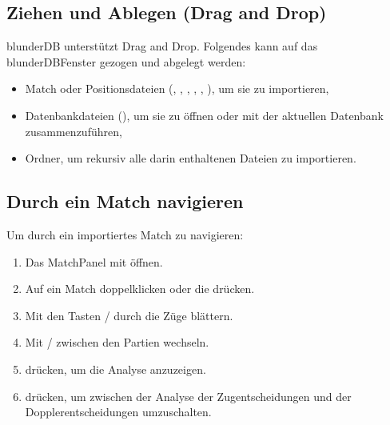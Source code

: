 \documentclass[letterpaper,10pt,german]{sphinxmanual}
\begin{document}
\subsection{Ziehen und Ablegen (Drag and Drop)}
\label{\detokenize{guide_utilisateur:glisser-deposer}}
\sphinxAtStartPar
blunderDB unterstützt Drag and Drop. Folgendes kann auf das blunderDB\sphinxhyphen{}Fenster gezogen und abgelegt werden:
\begin{itemize}
\item {} 
\sphinxAtStartPar
Match\sphinxhyphen{} oder Positionsdateien (, , , , , ), um sie zu importieren,

\item {} 
\sphinxAtStartPar
Datenbankdateien (), um sie zu öffnen oder mit der aktuellen Datenbank zusammenzuführen,

\item {} 
\sphinxAtStartPar
Ordner, um rekursiv alle darin enthaltenen Dateien zu importieren.

\end{itemize}


\subsection{Durch ein Match navigieren}
\label{\detokenize{guide_utilisateur:naviguer-dans-un-match}}
\sphinxAtStartPar
Um durch ein importiertes Match zu navigieren:
\begin{enumerate}
%
\item {} 
\sphinxAtStartPar
Das Match\sphinxhyphen{}Panel mit  öffnen.

\item {} 
\sphinxAtStartPar
Auf ein Match doppelklicken oder die  drücken.

\item {} 
\sphinxAtStartPar
Mit den Tasten  /  durch die Züge blättern.

\item {} 
\sphinxAtStartPar
Mit  /  zwischen den Partien wechseln.

\item {} 
\sphinxAtStartPar
{} drücken, um die Analyse anzuzeigen.

\item {} 
\sphinxAtStartPar
{} drücken, um zwischen der Analyse der Zugentscheidungen und der Dopplerentscheidungen umzuschalten.

\end{enumerate}
\end{document}
